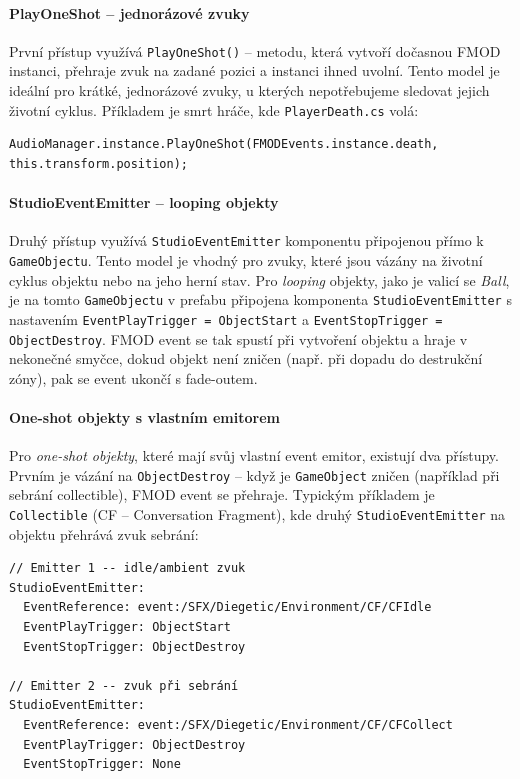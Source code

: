 \paragraph{PlayOneShot -- jednorázové zvuky}
První přístup využívá \texttt{PlayOneShot()} -- metodu, která vytvoří dočasnou FMOD instanci, přehraje zvuk na zadané pozici a instanci ihned uvolní. Tento model je ideální pro krátké, jednorázové zvuky, u kterých nepotřebujeme sledovat jejich životní cyklus. Příkladem je smrt hráče, kde \texttt{PlayerDeath.cs} volá:

\begin{lstlisting}[caption={PlayOneShot -- jednorázový zvuk}, label={lst:playoneshot}]
AudioManager.instance.PlayOneShot(FMODEvents.instance.death, this.transform.position);
\end{lstlisting}

\paragraph{StudioEventEmitter -- looping objekty}
Druhý přístup využívá \texttt{StudioEventEmitter} komponentu připojenou přímo k \texttt{GameObjectu}. Tento model je vhodný pro zvuky, které jsou vázány na životní cyklus objektu nebo na jeho herní stav. Pro \emph{looping} objekty, jako je valicí se \emph{Ball}, je na tomto \texttt{GameObjectu} v prefabu připojena komponenta \texttt{StudioEventEmitter} s nastavením \texttt{EventPlayTrigger = ObjectStart} a \texttt{EventStopTrigger = ObjectDestroy}. FMOD event se tak spustí při vytvoření objektu a hraje v nekonečné smyčce, dokud objekt není zničen (např. při dopadu do destrukční zóny), pak se event ukončí s fade-outem.

\paragraph{One-shot objekty s vlastním emitorem}
Pro \emph{one-shot objekty}, které mají svůj vlastní event emitor, existují dva přístupy. Prvním je vázání na \texttt{ObjectDestroy} -- když je \texttt{GameObject} zničen (například při sebrání collectible), FMOD event se přehraje. Typickým příkladem je \texttt{Collectible} (CF -- Conversation Fragment), kde druhý \texttt{StudioEventEmitter} na objektu přehrává zvuk sebrání:

\begin{lstlisting}[caption={Collectible prefab -- dva FMOD emitory}, label={lst:collectible-emitters}]
// Emitter 1 -- idle/ambient zvuk
StudioEventEmitter:
  EventReference: event:/SFX/Diegetic/Environment/CF/CFIdle
  EventPlayTrigger: ObjectStart
  EventStopTrigger: ObjectDestroy

// Emitter 2 -- zvuk při sebrání
StudioEventEmitter:
  EventReference: event:/SFX/Diegetic/Environment/CF/CFCollect
  EventPlayTrigger: ObjectDestroy
  EventStopTrigger: None
\end{lstlisting}

